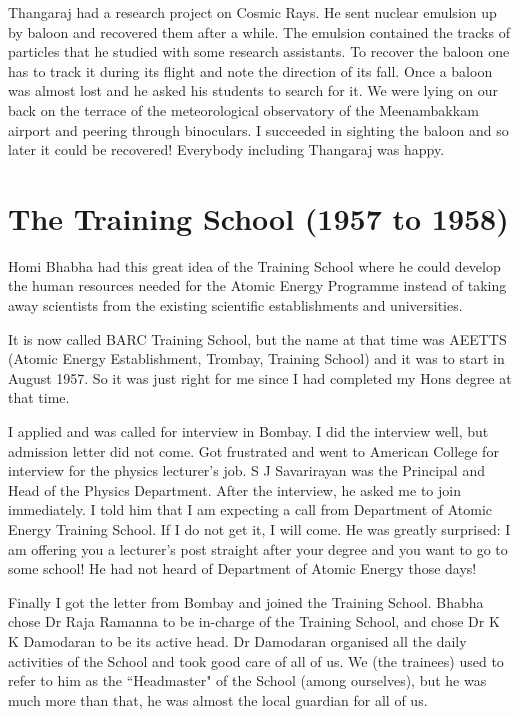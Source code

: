 Thangaraj had a research project on Cosmic Rays. He sent nuclear 
emulsion up by baloon and recovered them after a while. The emulsion 
contained the tracks of particles that he studied with some research 
assistants. To recover the baloon one has to track it during its flight 
and note the direction of its fall. Once a baloon was almost lost and he 
asked his students to search for it. We were lying on our back on the 
terrace of the meteorological observatory of the Meenambakkam airport 
and peering through binoculars. I succeeded in sighting the baloon and 
so later it could be recovered! Everybody including Thangaraj was happy.

\section*{The Training School (1957 to 1958)}

Homi Bhabha had this great idea of the Training School where he could develop the human resources needed for the Atomic Energy Programme instead of taking away scientists from the existing scientific establishments and universities.   

It is now called BARC Training School, but the name at that time was AEETTS (Atomic Energy Establishment, Trombay, Training School) and it was to start in August 1957. So it was just right for me since I had completed my Hons degree at that time.

I applied and was called for interview in Bombay. I did the interview 
well, but admission letter did not come. Got frustrated and went to 
American College for interview for the physics lectu\-rer's job. S J 
Savarirayan was the Principal and Head of the Physics Department. After 
the interview, he asked me to join immediately. I told him that I am 
expecting a call from Department of Atomic Energy Training School. If I 
do not get it, I will come. He was greatly surprised: I am offering you 
a lecturer's post straight after your degree and you want to go to some 
school! He had not heard of Department of Atomic Energy those days! 

Finally I got the letter from Bombay and joined the Trai\-ning School. Bhabha chose Dr Raja Ramanna to be in-charge of the Training School, and chose Dr K K Damodaran to be its active head. Dr Damodaran organised all the daily activities of the School and took good care of all of us. We (the trainees) used to refer to him as the ``Headmaster" of the School (among ourselves), but he was much more than that, he was almost the local guardian for all of us.
 
